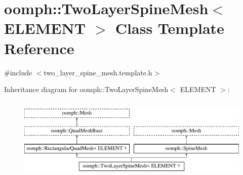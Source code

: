 \hypertarget{classoomph_1_1TwoLayerSpineMesh}{}\section{oomph\+:\+:Two\+Layer\+Spine\+Mesh$<$ E\+L\+E\+M\+E\+NT $>$ Class Template Reference}
\label{classoomph_1_1TwoLayerSpineMesh}


{\ttfamily \#include $<$two\+\_\+layer\+\_\+spine\+\_\+mesh.\+template.\+h$>$}

Inheritance diagram for oomph\+:\+:Two\+Layer\+Spine\+Mesh$<$ E\+L\+E\+M\+E\+NT $>$\+:\begin{figure}[H]
\begin{center}
\leavevmode
\includegraphics[height=4.000000cm]{classoomph_1_1TwoLayerSpineMesh}
\end{center}
\end{figure}
